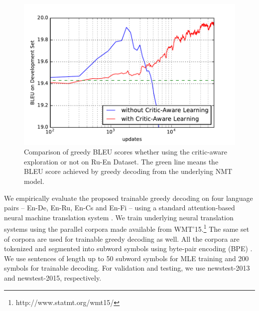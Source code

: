 \begin{figure}[t]
\centering
\includegraphics[width=\linewidth]{figs/trainable/lr_curve.pdf}
\vspace{-4mm}
\caption{\label{fig:lr}  
Comparison of greedy BLEU scores whether using the critic-aware exploration or not on Ru-En Dataset. The green line means the BLEU score achieved by greedy decoding from the underlying NMT model.} %
\vspace{-1mm}
\end{figure}


We empirically evaluate the proposed trainable greedy decoding on four language pairs -- En-De, En-Ru, En-Cs and En-Fi -- using a standard attention-based neural machine translation system \citep{bahdanau2014neural}. We train underlying neural translation systems using the parallel corpora made available from WMT'15.\footnote{http://www.statmt.org/wmt15/} The same set of corpora are used for trainable greedy decoding as well. All the corpora are tokenized and segmented into subword symbols using byte-pair encoding (BPE) \citep{sennrich2015neural}. We use sentences of length up to 50 subword symbols for MLE training and 200 symbols for trainable decoding. For validation and testing, we use newstest-2013 and newstest-2015, respectively.

